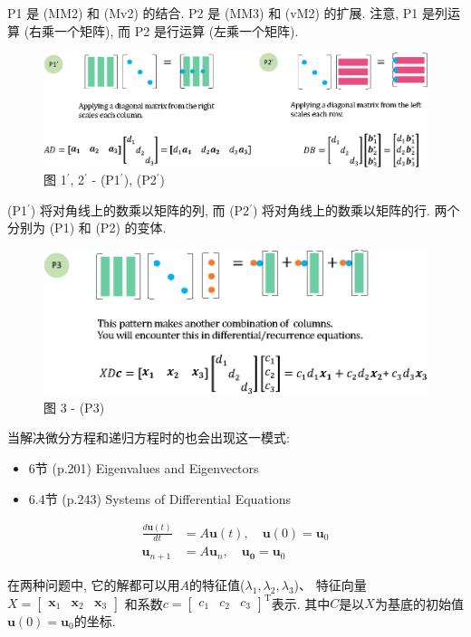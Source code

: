 \documentclass[letterpaper]{article}
\DeclareRobustCommand\transp{^{\mathrm{T}}}
\begin{document}
P1 是 (MM2) 和 (Mv2) 的结合. 
P2 是 (MM3) 和 (vM2) 的扩展. 
注意, P1 是列运算 (右乘一个矩阵), 
而 P2 是行运算 (左乘一个矩阵). 

\begin{figure}[H]
  \centering
  \includegraphics[scale=0.8]{Pattern11-22.eps}
  \caption{图 1$^\prime$, 2$^\prime$ - (P1$^\prime$), (P2$^\prime$)}
\end{figure}

(P1$^\prime$) 将对角线上的数乘以矩阵的列, 
而 (P2$^\prime$) 将对角线上的数乘以矩阵的行. 
两个分别为 (P1) 和 (P2) 的变体. 

\begin{figure}[H]
  \centering
  \includegraphics[scale=0.85]{Pattern3.eps}
  \caption{图 3 - (P3)}\label{fig:P3}
\end{figure}

当解决微分方程和递归方程时的也会出现这一模式: 

\begin{itemize}
  \item 6节 (p.201) Eigenvalues and Eigenvectors
  \item 6.4节 (p.243) Systems of Differential Equations
\end{itemize} 

\begin{align*}
  \frac{d \bm{u}(t) }{dt} &= A \bm{u}(t), \quad \bm{u}(0)=\bm{u}_0\\
  \bm{u}_{n+1} &= A \bm{u}_n, \quad \bm{u_0} = \bm{u}_0
\end{align*}

在两种问题中, 它的解都可以用$A$的特征值($\lambda_1, \lambda_2, \lambda_3$)、
特征向量$X=\begin{bmatrix} \bm{x}_1 & \bm{x}_2 & \bm{x}_3 \end{bmatrix}$
和系数$c=\begin{bmatrix} c_1 & c_2 & c_3 \end{bmatrix}\transp$表示. 
其中$C$是以$X$为基底的初始值$\bm{u}(0)=\bm{u}_0$的坐标.
\end{document}
